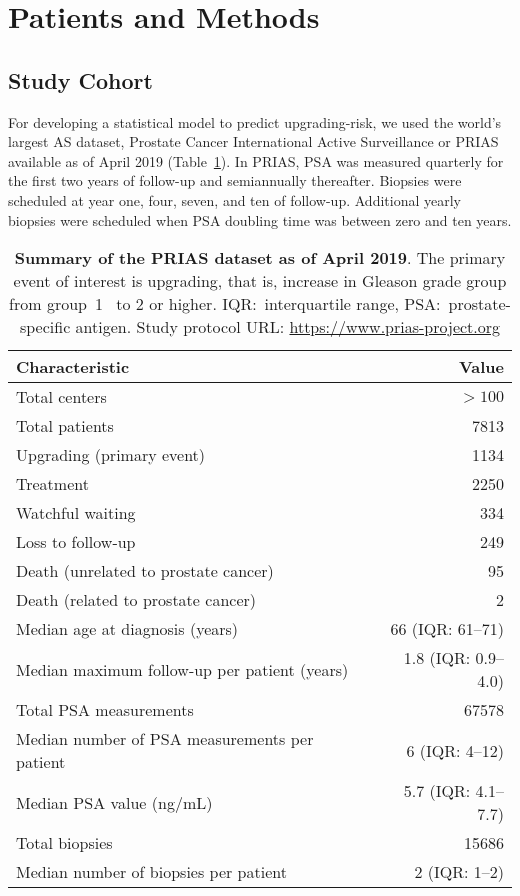 \section{Patients and Methods}
\subsection{Study Cohort}
\label{subsec:cohort}
For developing a statistical model to predict upgrading-risk, we used the world's largest AS dataset, Prostate Cancer International Active Surveillance or PRIAS~\citep{bul2013active} available as of April 2019 (Table~\ref{table:prias_summary}). In PRIAS, PSA was measured quarterly for the first two years of follow-up and semiannually thereafter. Biopsies were scheduled at year one, four, seven, and ten of follow-up. Additional yearly biopsies were scheduled when PSA doubling time was between zero and ten years.

\begin{table}
\small\sf\centering
\caption{\textbf{Summary of the PRIAS dataset as of April 2019}. The primary event of interest is upgrading, that is, increase in Gleason grade group from group~1~\citep{epsteinGG2014} to 2 or higher. IQR:~interquartile range, PSA:~prostate-specific antigen. Study protocol URL: \url{https://www.prias-project.org}}
\label{table:prias_summary}
\begin{tabular}{lr}
\toprule
\textbf{Characteristic} & \textbf{Value}\\
\midrule
Total centers & $> 100$\\
Total patients & 7813\\
Upgrading (primary event) & 1134\\
Treatment & 2250\\
Watchful waiting & 334\\
Loss to follow-up & 249\\
Death (unrelated to prostate cancer) & 95\\
Death (related to prostate cancer) & 2\\
\midrule
Median age at diagnosis (years) & 66 (IQR: 61--71)\\
Median maximum follow-up per patient (years) &  1.8 (IQR: 0.9--4.0)\\
Total PSA measurements & 67578\\
Median number of PSA measurements per patient &  6 (IQR: 4--12)\\
Median PSA value (ng/mL) & 5.7 (IQR: 4.1--7.7)\\
Total biopsies & 15686\\
Median number of biopsies per patient &  2 (IQR: 1--2)\\
\bottomrule
\end{tabular}
\end{table}

